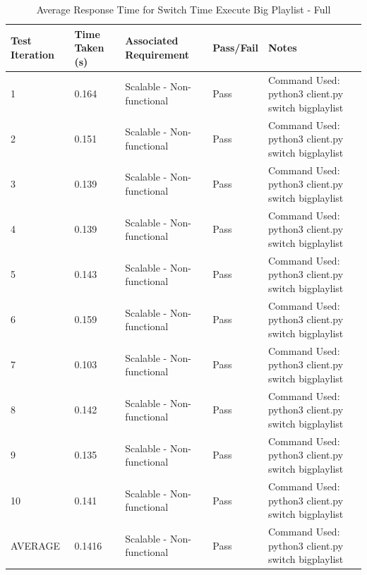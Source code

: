 \begin{table}[H]
  \centering
  \caption{Average Response Time for Switch Time Execute Big Playlist - Full}
  \label{tab:avgResTimeFullSwTEBP}
  \begin{tabularx}{\linewidth}{XlXlX}
    \toprule
    Test Iteration & Time Taken (s) & Associated Requirement & Pass/Fail & Notes \\
    \midrule
    1  & 0.164 & Scalable - Non-functional & Pass & Command Used: python3 client.py switch bigplaylist \\
    2  & 0.151 & Scalable - Non-functional & Pass & Command Used: python3 client.py switch bigplaylist \\
    3  & 0.139 & Scalable - Non-functional & Pass & Command Used: python3 client.py switch bigplaylist \\
    4  & 0.139 & Scalable - Non-functional & Pass & Command Used: python3 client.py switch bigplaylist \\
    5  & 0.143 & Scalable - Non-functional & Pass & Command Used: python3 client.py switch bigplaylist \\
    6  & 0.159 & Scalable - Non-functional & Pass & Command Used: python3 client.py switch bigplaylist \\
    7  & 0.103 & Scalable - Non-functional & Pass & Command Used: python3 client.py switch bigplaylist \\
    8  & 0.142 & Scalable - Non-functional & Pass & Command Used: python3 client.py switch bigplaylist \\
    9  & 0.135 & Scalable - Non-functional & Pass & Command Used: python3 client.py switch bigplaylist \\
    10 & 0.141 & Scalable - Non-functional & Pass & Command Used: python3 client.py switch bigplaylist \\
    \bottomrule
    AVERAGE & 0.1416 & Scalable - Non-functional & Pass & Command Used: python3 client.py switch bigplaylist \\
  \end{tabularx}
\end{table}
 
